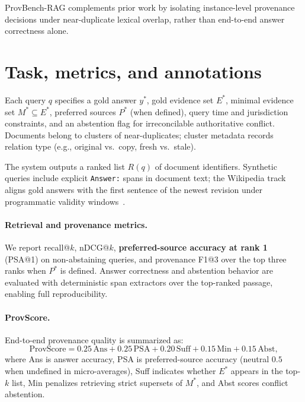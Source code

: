 \documentclass[sigconf,anonymous,review]{acmart}
\begin{document}
\begin{table}[t]
  \centering
  \footnotesize
  \caption{Positioning against recent benchmarks ($\checkmark$: explicit task coverage).}
  \label{tab:prior}
  \resizebox{\columnwidth}{!}{}
\end{table}

ProvBench-RAG complements prior work by isolating instance-level provenance decisions under near-duplicate lexical overlap, rather than end-to-end answer correctness alone.

\section{Task, metrics, and annotations}
\label{sec:task}

Each query $q$ specifies a gold answer $y^\ast$, gold evidence set $E^\ast$, minimal evidence set $M^\ast \subseteq E^\ast$, preferred sources $P^\ast$ (when defined), query time and jurisdiction constraints, and an abstention flag for irreconcilable authoritative conflict.
Documents belong to clusters of near-duplicates; cluster metadata records relation type (e.g., original vs.\ copy, fresh vs.\ stale).

The system outputs a ranked list $R(q)$ of document identifiers.
Synthetic queries include explicit \texttt{Answer:} spans in document text; the Wikipedia track aligns gold answers with the first sentence of the newest revision under programmatic validity windows~\cite{wiki_api}.

\paragraph{Retrieval and provenance metrics.}
We report recall@$k$, nDCG@$k$, \textbf{preferred-source accuracy at rank 1} (PSA@1) on non-abstaining queries, and provenance F1@3 over the top three ranks when $P^\ast$ is defined.
Answer correctness and abstention behavior are evaluated with deterministic span extractors over the top-ranked passage, enabling full reproducibility.

\paragraph{ProvScore.}
End-to-end provenance quality is summarized as:
\begin{equation}
\label{eq:provscore}
\text{ProvScore} = 0.25\,\text{Ans} + 0.25\,\text{PSA} + 0.20\,\text{Suff} + 0.15\,\text{Min} + 0.15\,\text{Abst},
\end{equation}
where Ans is answer accuracy, PSA is preferred-source accuracy (neutral $0.5$ when undefined in micro-averages), Suff indicates whether $E^\ast$ appears in the top-$k$ list, Min penalizes retrieving strict supersets of $M^\ast$, and Abst scores conflict abstention.
\end{document}
